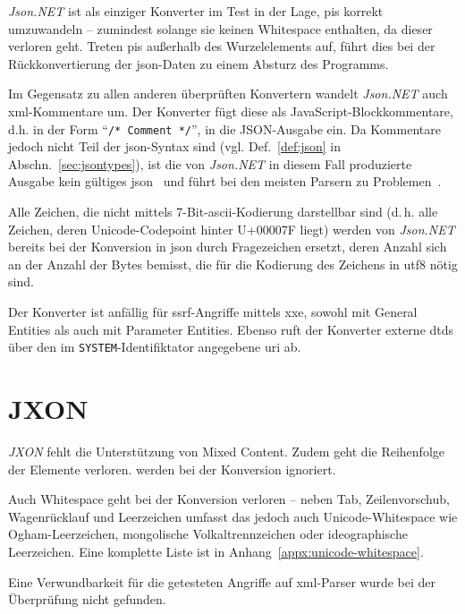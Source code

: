 \emph{Json.NET} ist als einziger Konverter im Test in der Lage, \glspl{pi} korrekt umzuwandeln -- zumindest solange sie keinen Whitespace enthalten, da dieser verloren geht. Treten \glspl{pi} außerhalb des Wurzelelements auf, führt dies bei der Rückkonvertierung der \acrshort{json}-Daten zu einem Absturz des Programms.

Im Gegensatz zu allen anderen überprüften Konvertern wandelt \emph{Json.NET} auch \acrshort{xml}-Kommentare um. Der Konverter fügt diese als JavaScript-Blockkommentare, d.h. in der Form \enquote{\texttt{/* Comment */}}, in die JSON-Ausgabe ein. Da Kommentare jedoch nicht Teil der \acrshort{json}-Syntax sind (vgl. Def.~\ref{def:json} in Abschn.~\ref{sec:jsontypes}), ist die von \emph{Json.NET} in diesem Fall produzierte Ausgabe kein gültiges \acrshort{json}~\cite{ecma404,rfc7159} und führt bei den meisten Parsern zu Problemen~\cite[Abschn.~2.1,~4.1]{seriot2016minefield}.

Alle Zeichen, die nicht mittels 7-Bit-\acrshort{ascii}-Kodierung darstellbar sind (d.\,h. alle Zeichen, deren Unicode-Codepoint hinter U+00007F liegt) werden von \emph{Json.NET} bereits bei der Konversion in \acrshort{json} durch Fragezeichen ersetzt, deren Anzahl sich an der Anzahl der Bytes bemisst, die für die Kodierung des Zeichens in \acrshort{utf8} nötig sind.

Der Konverter ist anfällig für \acrshort{ssrf}-Angriffe mittels \acrshort{xxe}, sowohl mit General Entities als auch mit Parameter Entities. Ebenso ruft der Konverter externe \glspl{dtd} über den im \texttt{SYSTEM}-Identifiktator angegebene \acrshort{uri} ab.

\section{JXON}
\label{sec:jxon}

\emph{JXON} fehlt die Unterstützung von Mixed Content. Zudem geht die Reihenfolge der Elemente verloren.  werden bei der Konversion ignoriert.

Auch Whitespace geht bei der Konversion verloren -- neben Tab, Zeilenvorschub, Wagenrücklauf und Leerzeichen umfasst das jedoch auch Unicode-Whitespace wie Ogham-Leerzeichen, mongolische Volkaltrennzeichen oder ideographische Leerzeichen. Eine komplette Liste ist in Anhang~\ref{appx:unicode-whitespace}.

Eine Verwundbarkeit für die getesteten Angriffe auf \acrshort{xml}-Parser wurde bei der Überprüfung nicht gefunden.

